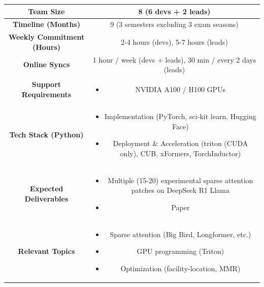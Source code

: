 \documentclass{article}
\begin{document}
\begin{center}
    \begin{tabular}{cc}  
        \toprule
        \textbf{Team Size} & 8 (6 devs + 2 leads) \\
        \midrule
        \textbf{Timeline (Months)} & 9 (3 semesters excluding 3 exam seasons) \\
        \midrule
        \textbf{Weekly Commitment (Hours)} & 2-4 hours (devs), 5-7 hours (leads) \\
        \midrule
        \textbf{Online Syncs} & 1 hour / week (devs + leads), 30 min / every 2 days (leads)\\
        \midrule
        \textbf{Support Requirements} & 
        \multicolumn{1}{p{10.5cm}}{
            \begin{itemize}
                \item NVIDIA A100 / H100 GPUs
            \end{itemize}
            } \\
        \midrule
        \textbf{Tech Stack (Python)} & \multicolumn{1}{p{10.5cm}}{
            \begin{itemize}
                \item Implementation (PyTorch, sci-kit learn, Hugging Face)
                \item Deployment \& Acceleration (triton (CUDA only), CUB, xFormers, TorchInductor)
            \end{itemize}
            } \\
        \midrule
        \textbf{Expected Deliverables} & \multicolumn{1}{p{10.5cm}}{
            \begin{itemize}
                \item Multiple (15-20) experimental sparse attention patches on DeepSeek R1 Llama
                \item Paper
            \end{itemize}
            } \\
        \midrule
        \textbf{Relevant Topics} & \multicolumn{1}{p{10.5cm}}{
            \begin{itemize}
                \item Sparse attention (Big Bird, Longformer, etc.)
                \item GPU programming (Triton)
                \item Optimization (facility-location, MMR)
            \end{itemize}
            } \\
        \bottomrule
    \end{tabular}
\end{center}
\newpage
\end{document}
